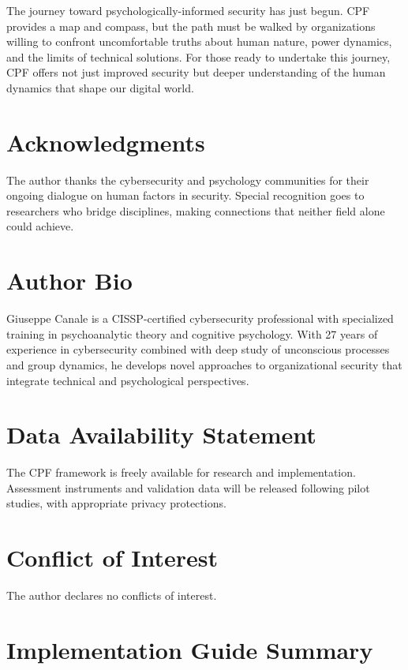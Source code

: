 \documentclass[11pt,a4paper]{article}
\begin{document}
The journey toward psychologically-informed security has just begun. CPF provides a map and compass, but the path must be walked by organizations willing to confront uncomfortable truths about human nature, power dynamics, and the limits of technical solutions. For those ready to undertake this journey, CPF offers not just improved security but deeper understanding of the human dynamics that shape our digital world.

\section*{Acknowledgments}

The author thanks the cybersecurity and psychology communities for their ongoing dialogue on human factors in security. Special recognition goes to researchers who bridge disciplines, making connections that neither field alone could achieve.

\section*{Author Bio}

Giuseppe Canale is a CISSP-certified cybersecurity professional with specialized training in psychoanalytic theory and cognitive psychology. With 27 years of experience in cybersecurity combined with deep study of unconscious processes and group dynamics, he develops novel approaches to organizational security that integrate technical and psychological perspectives.

\section*{Data Availability Statement}

The CPF framework is freely available for research and implementation. Assessment instruments and validation data will be released following pilot studies, with appropriate privacy protections.

\section*{Conflict of Interest}

The author declares no conflicts of interest.

\appendix

\section{Implementation Guide Summary}
\label{app:implementation}
\end{document}
